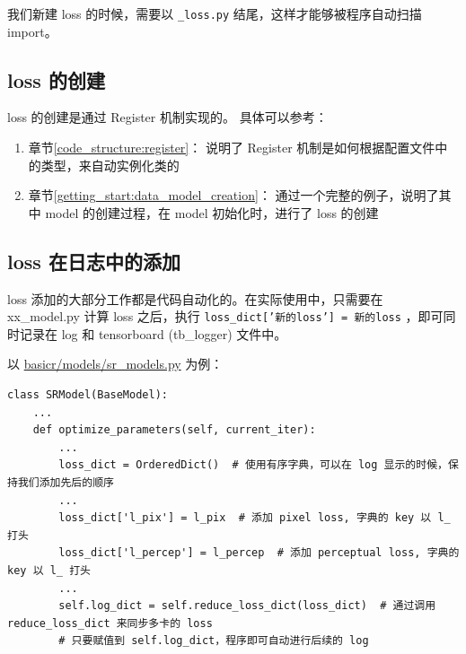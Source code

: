 \documentclass[../main.tex]{subfiles}
\begin{document}
\vspace{0.5cm}
\renewcommand*\DTstyle{\ttfamily\textcolor{black}}
\vspace{0.5cm}

\begin{hl} %
    我们新建 loss 的时候，需要以 \texttt{\_loss.py} 结尾，这样才能够被程序自动扫描 import。
\end{hl}

\subsection{loss 的创建}\label{code_structure:loss_creation}

loss 的创建是通过 Register 机制实现的。
具体可以参考：
\begin{enumerate}
    \item 章节\ref{code_structure:register}： 说明了 Register 机制是如何根据配置文件中的类型，来自动实例化类的
    \item 章节\ref{getting_start:data_model_creation}： 通过一个完整的例子，说明了其中 model 的创建过程，在 model 初始化时，进行了 loss 的创建
\end{enumerate}

\subsection{loss 在日志中的添加}\label{code_structure:loss_log}

loss 添加的大部分工作都是代码自动化的。在实际使用中，只需要在 xx\_model.py 计算 loss 之后，执行 \texttt{loss\_dict['新的loss'] = 新的loss} ，即可同时记录在 log 和 tensorboard (tb\_logger) 文件中。

以 \href{https://github.com/XPixelGroup/BasicSR/blob/master/basicsr/models/sr_model.py}{basicr/models/sr\_models.py} 为例：
\begin{verbatim}
class SRModel(BaseModel):
    ...
    def optimize_parameters(self, current_iter):
        ...
        loss_dict = OrderedDict()  # 使用有序字典，可以在 log 显示的时候，保持我们添加先后的顺序
        ...
        loss_dict['l_pix'] = l_pix  # 添加 pixel loss, 字典的 key 以 l_ 打头
        loss_dict['l_percep'] = l_percep  # 添加 perceptual loss, 字典的 key 以 l_ 打头
        ...
        self.log_dict = self.reduce_loss_dict(loss_dict)  # 通过调用 reduce_loss_dict 来同步多卡的 loss
        # 只要赋值到 self.log_dict，程序即可自动进行后续的 log
\end{verbatim}
\end{document}

